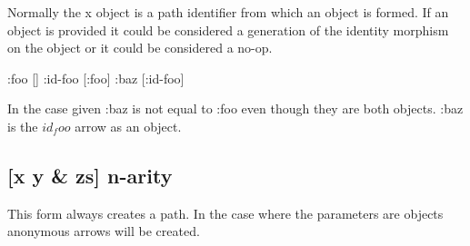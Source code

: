 \documentclass{article}
\begin{document}
Normally the x object is a path identifier from which an object is formed.
If an object is provided it could be considered
a generation of the identity morphism on the object
or it could be considered a no-op.

{:foo [] :id-foo [:foo] :baz [:id-foo]}

In the case given :baz is not equal to :foo even though they are both objects.
:baz is the $id_foo$ arrow as an object.

\subsection{[x y & zs] n-arity}

This form always creates a path.
In the case where the parameters are objects anonymous arrows will be created.
\end{document}
